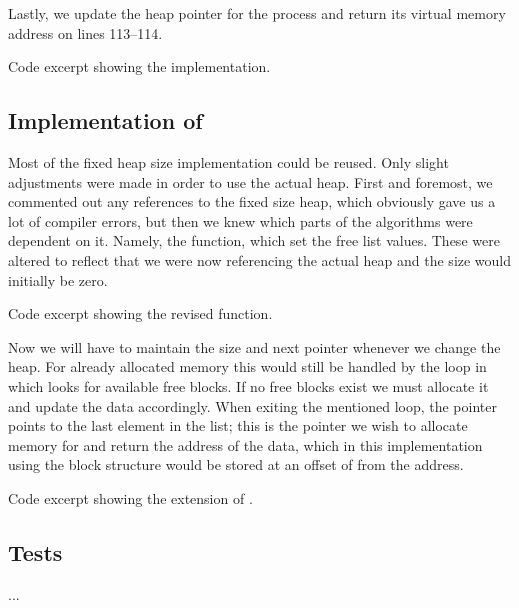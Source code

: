 Lastly, we update the heap pointer for the process and return its virtual
memory address on lines 113--114.

{Code excerpt showing the  implementation.}

\subsection{Implementation of }
Most of the fixed heap size implementation could be reused. Only slight
adjustments were made in order to use the actual heap. First and foremost, we
commented out any references to the fixed size heap, which obviously gave us a
lot of compiler errors, but then we knew which parts of the algorithms were
dependent on it. Namely, the  function, which set the free
list values. These were altered to reflect that we were now referencing the
actual heap and the size would initially be zero.

{Code excerpt showing the revised  function.}

Now we will have to maintain the size and next pointer whenever we change the
heap. For already allocated memory this would still be handled by the loop in
 which looks for available free blocks. If no free blocks exist
we must allocate it and update the data accordingly. When exiting the
mentioned loop, the pointer  points to the last element in the
list; this is the pointer we wish to allocate memory for and return the
address of the data, which in this implementation using the block structure
would be stored at an offset of  from the  address.

{Code excerpt showing the extension of .}

\subsection{Tests}
...

